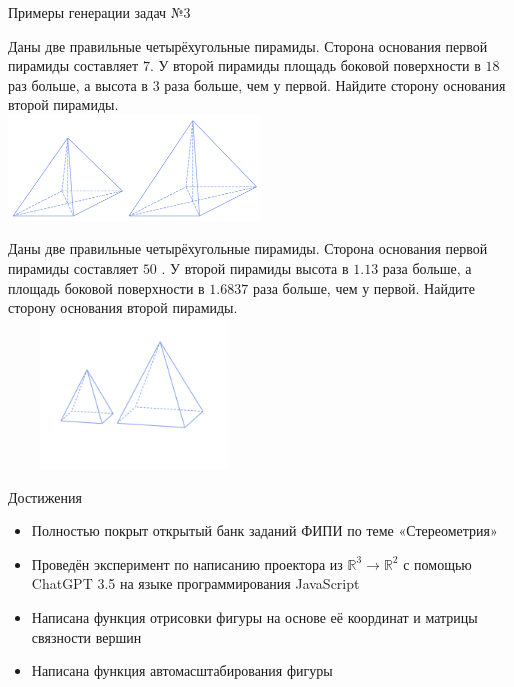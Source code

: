 \documentclass[aspectratio=169,12pt]{beamer}
\begin{document}
\begin{frame}{Примеры генерации задач №3}
	\begin{multicols}{2}
		\footnotesize
		Даны две правильные четырёхугольные пирамиды. Сторона основания первой пирамиды составляет $7$. У второй пирамиды площадь боковой поверхности в $18$ раз больше, а высота в $3$ раза больше, чем у первой. Найдите сторону основания второй пирамиды.\\

		\includegraphics[width=0.5\textwidth]{5}\\
		\vfill\null
		\columnbreak

		Даны две правильные четырёхугольные пирамиды. Сторона основания первой пирамиды составляет $50$ . У второй пирамиды высота в $1.13$  раза больше, а площадь боковой поверхности в $1.6837$  раза больше, чем у первой. Найдите сторону основания второй пирамиды.\\

		\includegraphics[width=0.5\textwidth,height=4cm]{6}\\

	\end{multicols}
\end{frame}

\begin{frame}{Достижения}
	\begin{itemize}
		\item Полностью покрыт открытый банк заданий ФИПИ по теме «Стереометрия»
		\item Проведён эксперимент по написанию проектора из $\mathbb{R}^3 \to \mathbb{R}^2$ с помощью ChatGPT 3.5 на языке программирования JavaScript
		\item Написана функция отрисовки фигуры на основе её координат и матрицы связности вершин
		\item Написана функция автомасштабирования фигуры
	\end{itemize}

\end{frame}
\end{document}
